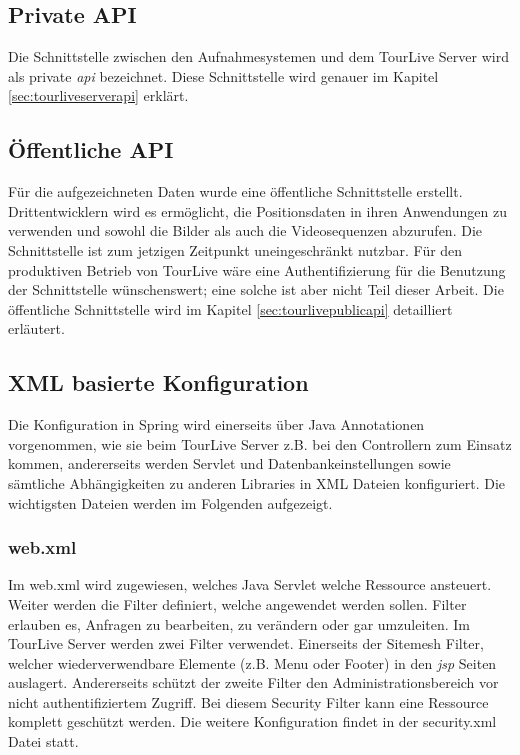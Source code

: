 \subsection{Private API}
Die Schnittstelle zwischen den Aufnahmesystemen und dem TourLive Server wird als private \textit{\gls{api}} bezeichnet. Diese Schnittstelle wird genauer im Kapitel \ref{sec:tourliveserverapi} erklärt.

\subsection{Öffentliche API}
Für die aufgezeichneten Daten wurde eine öffentliche Schnittstelle erstellt. Drittentwicklern wird es ermöglicht, die Positionsdaten in ihren Anwendungen zu verwenden und sowohl die Bilder als auch die Videosequenzen abzurufen. Die Schnittstelle ist zum jetzigen Zeitpunkt uneingeschränkt nutzbar. Für den produktiven Betrieb von TourLive wäre eine Authentifizierung für die Benutzung der Schnittstelle wünschenswert; eine solche ist aber nicht Teil dieser Arbeit. Die öffentliche Schnittstelle wird im Kapitel \ref{sec:tourlivepublicapi} detailliert erläutert.

\subsection{XML basierte Konfiguration}
Die Konfiguration in Spring wird einerseits über Java Annotationen vorgenommen, wie sie beim TourLive Server z.B. bei den Controllern zum Einsatz kommen, andererseits werden Servlet und Datenbankeinstellungen sowie sämtliche Abhängigkeiten zu anderen Libraries in XML Dateien konfiguriert. Die wichtigsten Dateien werden im Folgenden aufgezeigt.

\subsubsection{web.xml}
Im web.xml wird zugewiesen, welches Java Servlet welche Ressource ansteuert. Weiter werden die Filter definiert, welche angewendet werden sollen. Filter erlauben es, Anfragen zu bearbeiten, zu verändern oder gar umzuleiten. Im TourLive Server werden zwei Filter verwendet. Einerseits der Sitemesh Filter, welcher wiederverwendbare Elemente (z.B. Menu oder Footer) in den \textit{\gls{jsp}} Seiten auslagert. Andererseits schützt der zweite Filter den Administrationsbereich vor nicht authentifiziertem Zugriff. Bei diesem Security Filter kann eine Ressource komplett geschützt werden. Die weitere Konfiguration findet in der security.xml Datei statt.

